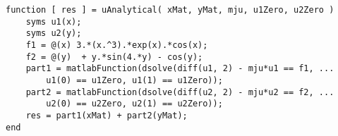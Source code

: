 \documentclass[11pt, oneside, final]{article}
\begin{document}
    \begin{verbatim}
function [ res ] = uAnalytical( xMat, yMat, mju, u1Zero, u2Zero )
    syms u1(x);
    syms u2(y);
    f1 = @(x) 3.*(x.^3).*exp(x).*cos(x);
    f2 = @(y)  + y.*sin(4.*y) - cos(y);
    part1 = matlabFunction(dsolve(diff(u1, 2) - mju*u1 == f1, ...
        u1(0) == u1Zero, u1(1) == u1Zero));
    part2 = matlabFunction(dsolve(diff(u2, 2) - mju*u2 == f2, ...
        u2(0) == u2Zero, u2(1) == u2Zero));
    res = part1(xMat) + part2(yMat);
end


        \end{verbatim}
    
\end{document}
